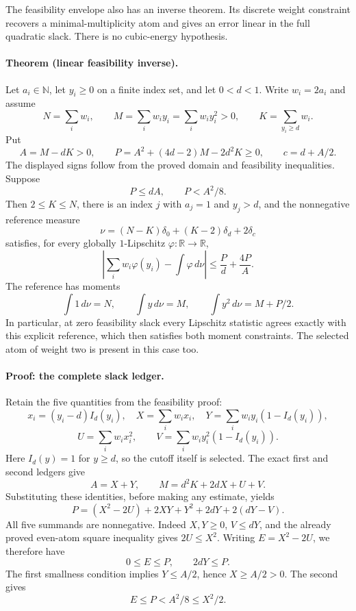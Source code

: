 The feasibility envelope also has an inverse theorem.  Its discrete weight
constraint recovers a minimal-multiplicity atom and gives an error linear
in the full quadratic slack.  There is no cubic-energy hypothesis.

\paragraph{Theorem (linear feasibility inverse).}
Let \(a_i\in\mathbb N\), let \(y_i\ge0\) on a finite index set, and let
\(0<d<1\).  Write \(w_i=2a_i\) and assume
\[
 N=\sum_iw_i,\qquad
 M=\sum_iw_i y_i=\sum_iw_i y_i^2>0,\qquad
 K=\sum_{y_i\ge d}w_i.
\]
Put
\[
 A=M-dK>0,\qquad
 P=A^2+(4d-2)M-2d^2K\ge0,\qquad c=d+A/2.
\]
The displayed signs follow from the proved domain and feasibility
inequalities.  Suppose
\[
 P\le dA,\qquad P<A^2/8.
\]
Then \(2\le K\le N\), there is an index \(j\) with
\(a_j=1\) and \(y_j>d\), and the nonnegative reference measure
\[
 \nu=(N-K)\delta_0+(K-2)\delta_d+2\delta_c
\]
satisfies, for every globally \(1\)-Lipschitz
\(\varphi:\mathbb R\to\mathbb R\),
\[
 \left|\sum_iw_i\varphi(y_i)-\int\varphi\,d\nu\right|
 \le \frac Pd+\frac{4P}{A}.
\]
The reference has moments
\[
 \int1\,d\nu=N,\qquad
 \int y\,d\nu=M,\qquad
 \int y^2\,d\nu=M+P/2.
\]
In particular, at zero feasibility slack every Lipschitz statistic agrees
exactly with this explicit reference, which then satisfies both moment
constraints.  The selected atom of weight two is present in this case too.

\paragraph{Proof: the complete slack ledger.}
Retain the five quantities from the feasibility proof:
\[
 x_i=(y_i-d)I_d(y_i),\quad
 X=\sum_iw_ix_i,\quad
 Y=\sum_iw_i y_i(1-I_d(y_i)),
\]
\[
 U=\sum_iw_i x_i^2,\qquad
 V=\sum_iw_i y_i^2(1-I_d(y_i)).
\]
Here \(I_d(y)=1\) for \(y\ge d\), so the cutoff itself is selected.
The exact first and second ledgers give
\[
 A=X+Y,\qquad M=d^2K+2dX+U+V.
\]
Substituting these identities, before making any estimate, yields
\[
 P=(X^2-2U)+2XY+Y^2+2dY+2(dY-V).
\]
All five summands are nonnegative.  Indeed \(X,Y\ge0\), \(V\le dY\),
and the already proved even-atom square inequality gives \(2U\le X^2\).
Writing \(E=X^2-2U\), we therefore have
\[
 0\le E\le P,\qquad 2dY\le P.
\]
The first smallness condition implies \(Y\le A/2\), hence
\(X\ge A/2>0\).  The second gives
\[
 E\le P<A^2/8\le X^2/2.
\]

